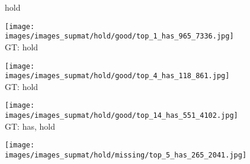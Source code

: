 \documentclass[10pt,twocolumn,letterpaper]{article}
\begin{document}
\begin{figure*}[t]
    
	\begin{minipage}[t]{0.005\textwidth}
    	\centering
    	\vspace{-9.5ex}
    	\begin{turn}{90}
    	hold
    	\end{turn}
    	\vspace{2ex}
    \end{minipage}
    \hspace{0.01\textwidth}
	\begin{minipage}[t]{0.18\textwidth}
    	\centering
       	\texttt{[image: images/images\_supmat/hold/good/top\_1\_has\_965\_7336.jpg]}\\
       	\vspace{0.3ex}
       	GT: hold
       	\vspace{2ex}
    \end{minipage}
    \hspace{0.005\textwidth}
	\begin{minipage}[t]{0.18\textwidth}
    	\centering
       	\texttt{[image: images/images\_supmat/hold/good/top\_4\_has\_118\_861.jpg]}\\
       	\vspace{0.3ex}
       	GT: hold
       	\vspace{0.2ex}
    \end{minipage}
    \hspace{0.005\textwidth}
    \begin{minipage}[t]{0.18\textwidth}
    	\centering
      	\texttt{[image: images/images\_supmat/hold/good/top\_14\_has\_551\_4102.jpg]}\\
      	\vspace{0.3ex}
       	GT: has, hold
       	\vspace{0.2ex}
    \end{minipage}
    \hspace{0.005\textwidth}
	\begin{minipage}[t]{0.18\textwidth}
    	\centering
       	\texttt{[image: images/images\_supmat/hold/missing/top\_5\_has\_265\_2041.jpg]}\\

\end{minipage}
\end{figure*}
\end{document}
